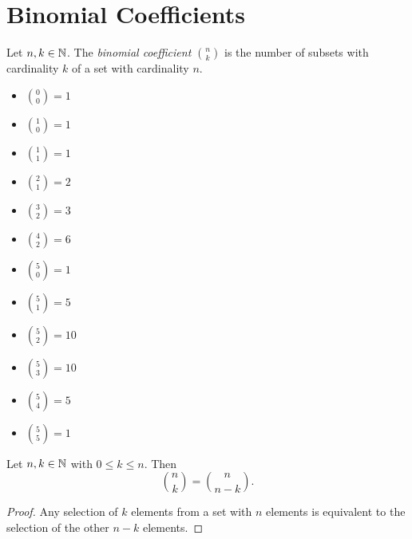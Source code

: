 \section{Binomial Coefficients}

\begin{defn}\label{binomial-coefficient}
Let $n, k \in \mathbb{N}$. The \emph{binomial coefficient} $\binom{n}{k}$ is the number of subsets with cardinality $k$ of a set with cardinality $n$.
\end{defn}

\begin{exmp}\proofbreak
    \begin{multicols}{3}
        \begin{itemize}
            \item $\binom{0}{0} = 1$
            \item $\binom{1}{0} = 1$
            \item $\binom{1}{1} = 1$
            \item $\binom{2}{1} = 2$
        \end{itemize}

        \columnbreak

        \begin{itemize}
            \item $\binom{3}{2} = 3$
            \item $\binom{4}{2} = 6$
            \item $\binom{5}{0} = 1$
            \item $\binom{5}{1} = 5$
        \end{itemize}

        \columnbreak

        \begin{itemize}
            \item $\binom{5}{2} = 10$
            \item $\binom{5}{3} = 10$
            \item $\binom{5}{4} = 5$
            \item $\binom{5}{5} = 1$
        \end{itemize}
    \end{multicols}
\end{exmp}

\begin{prop}\label{binomial-complement}
    Let $n, k \in \mathbb{N}$ with $0 \leq k \leq n$. Then \[\binom{n}{k} = \binom{n}{n-k}.\]
\end{prop}

\begin{proof}
    Any selection of $k$ elements from a set with $n$ elements is equivalent to the selection of the other $n-k$ elements.
\end{proof}

